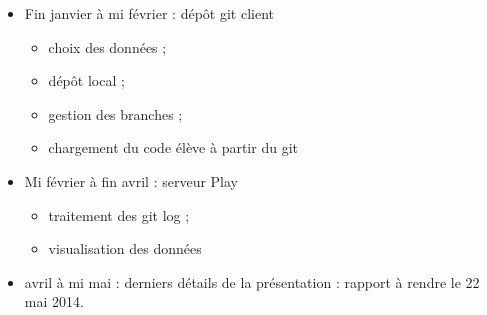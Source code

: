 \documentclass[12pt,a4paper]{article}
\author{HUGUENIN Cédric}
\begin{document}

\begin{itemize}
\item Fin janvier à mi février : dépôt git client
	\begin{itemize}
	\item choix des données ;
	\item dépôt local ;
	\item gestion des branches ;
	\item chargement du code élève à partir du git
	\end{itemize}
\item Mi février à fin avril : serveur Play
	\begin{itemize}
	\item traitement des git log ;
	\item visualisation des données
	\end{itemize}
\item avril à mi mai : derniers détails de la présentation : rapport à rendre le 22 mai 2014.
\end{itemize}
\end{document}
